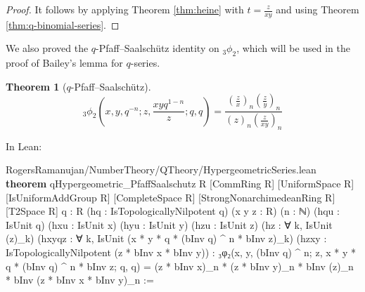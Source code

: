 \documentclass[12pt]{amsart}
\newtheorem{theorem}{Theorem}[subsection]
\theoremstyle{definition}
\theoremstyle{remark}
\numberwithin{equation}{subsection}
\newcommand{\kw}[1]{\textcolor{keywordcolor}{\textbf{#1}}}
\newcommand{\var}[1]{\textcolor{tacticcolor}{#1}}
\newcommand{\imp}[1]{\textcolor{commentcolor}{\textbraceleft#1\textbraceright}}
\begin{document}
\begin{proof}
    It follows by applying Theorem \ref{thm:heine} with $t = \frac{z}{xy}$ and using Theorem \ref{thm:q-binomial-series}.
\end{proof}

We also proved the $q$-Pfaff--Saalsch\"utz identity on ${}_{3}\phi_{2}$, which will be used in the proof of Bailey's lemma for $q$-series.
\begin{theorem}[$q$-Pfaff--Saalsch\"utz]
\label{thm:qPS-original}
    \begin{equation}
        {}_{3}\phi_{2}\left(x, y, q^{-n}; z, \frac{xyq^{1-n}}{z}; q, q\right) = \frac{\left(\frac{z}{x}\right)_n \left(\frac{z}{y}\right)_n}{(z)_n \left(\frac{z}{xy}\right)_n}
    \end{equation}
\end{theorem}

In Lean:

\begin{code}{RogersRamanujan/NumberTheory/QTheory/HypergeometricSeries.lean}
\kw{theorem} qHypergeometric_PfaffSaalschutz \imp{R} [CommRing \var{R}] [UniformSpace \var{R}]
  [IsUniformAddGroup \var{R}] [CompleteSpace \var{R}] [StrongNonarchimedeanRing \var{R}] [T2Space \var{R}]
  \imp{q : R} (\var{hq} : IsTopologicallyNilpotent \var{q}) (\var{x} \var{y} \var{z} : \var{R}) (\var{n} : ℕ)
  (\var{hqu} : IsUnit \var{q}) (\var{hxu} : IsUnit \var{x}) (\var{hyu} : IsUnit \var{y}) (\var{hzu} : IsUnit \var{z})
  (\var{hz} : ∀ \var{k}, IsUnit (\var{z})_\var{k})
  (\var{hxyqz} : ∀ \var{k}, IsUnit (\var{x} * \var{y} * \var{q} * (bInv \var{q}) ^ \var{n} * bInv \var{z})_\var{k})
  (\var{hzxy} : IsTopologicallyNilpotent (\var{z} * bInv \var{x} * bInv \var{y})) :
  ₃φ₂(\var{x}, \var{y}, (bInv \var{q}) ^ \var{n}; \var{z}, \var{x} * \var{y} * \var{q} * (bInv \var{q}) ^ \var{n} * bInv \var{z}; \var{q}, \var{q}) =
    (\var{z} * bInv \var{x})_\var{n} * (\var{z} * bInv \var{y})_\var{n} * bInv (\var{z})_\var{n} * bInv (\var{z} * bInv \var{x} * bInv \var{y})_\var{n} :=
\end{code}
\end{document}
